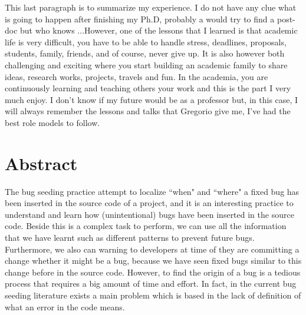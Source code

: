 \documentclass[a4paper, 12pt]{book}
\begin{document}
This last paragraph is to summarize my experience. I do not have any clue what is going to happen after finishing my Ph.D, probably a would try to find a post-doc but who knows ...However, one of the lessons that I learned is that academic life is very difficult, you have to be able to handle stress, deadlines, proposals, students, family, friends, and of course, never give up. It is also however both challenging and exciting where you start building an academic family to share ideas, research works, projects, travels and fun. In the academia, you are continuously learning and teaching others your work and this is the part I very much enjoy. I don't know if my future would be as a professor but, in this case, I will always remember the lessons and talks that Gregorio give me, I've had the best role models to follow. 


\chapter*{Abstract}

The bug seeding practice attempt to localize ``when" and ``where" a fixed bug has been inserted in the source code of a project, and it is an interesting practice to understand and learn how (unintentional) bugs have been inserted in the source code. Beside this is a complex task to perform, we can use all the information that we have learnt such as different patterns to prevent future bugs. Furthermore, we also can warning to developers at time of they are committing a change whether it might be a bug, because we have seen fixed bugs similar to this change before in the source code. However, to find the origin of a bug is a tedious process that requires a big amount of time and effort. In fact, in the current bug seeding literature exists a main problem  which is based in the lack of definition of what an error in the code means.
\end{document}
